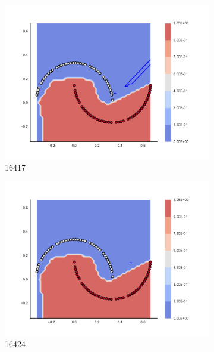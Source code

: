\begin{figure}[h]
\begin{subfigure}[b]{0.09\textwidth}
    \includegraphics[clip, trim=2.35cm 1.75cm 4.5cm 0cm,width=\textwidth]{img/convergence/16417.pdf}
    \caption{16417}
    \label{fig:convergence_16417}
\end{subfigure}
%
\begin{subfigure}[b]{0.09\textwidth}
    \includegraphics[clip, trim=2.35cm 1.75cm 4.5cm 0cm,width=\textwidth]{img/convergence/16424.pdf}
    \caption{16424}
    \label{fig:convergence_16424}
\end{subfigure}
%
\begin{subfigure}[b]{0.09\textwidth}

\end{subfigure}
\end{figure}
